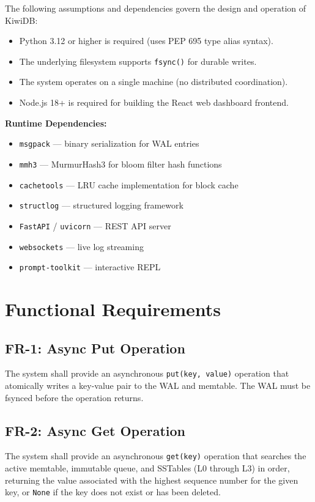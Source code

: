 \documentclass[oneside,a4paper,12pt]{book}
\begin{document}
The following assumptions and dependencies govern the design and operation of KiwiDB:

\begin{itemize}[leftmargin=2em]
    \item Python 3.12 or higher is required (uses PEP 695 type alias syntax).
    \item The underlying filesystem supports \texttt{fsync()} for durable writes.
    \item The system operates on a single machine (no distributed coordination).
    \item Node.js 18+ is required for building the React web dashboard frontend.
\end{itemize}
\textbf{Runtime Dependencies:}
\begin{itemize}[leftmargin=2em]
    \item \texttt{msgpack} --- binary serialization for WAL entries
    \item \texttt{mmh3} --- MurmurHash3 for bloom filter hash functions
    \item \texttt{cachetools} --- LRU cache implementation for block cache
    \item \texttt{structlog} --- structured logging framework
    \item \texttt{FastAPI} / \texttt{uvicorn} --- REST API server
    \item \texttt{websockets} --- live log streaming
    \item \texttt{prompt-toolkit} --- interactive REPL
\end{itemize}

\section{Functional Requirements}

\subsection{FR-1: Async Put Operation}
The system shall provide an asynchronous \texttt{put(key, value)} operation that atomically writes a key-value pair to the WAL and memtable. The WAL must be fsynced before the operation returns.

\subsection{FR-2: Async Get Operation}
The system shall provide an asynchronous \texttt{get(key)} operation that searches the active memtable, immutable queue, and SSTables (L0 through L3) in order, returning the value associated with the highest sequence number for the given key, or \texttt{None} if the key does not exist or has been deleted.
\end{document}

